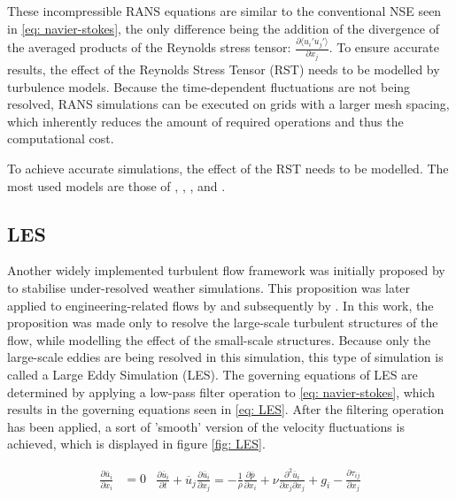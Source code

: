 These incompressible RANS equations are similar to the conventional NSE seen in \autoref{eq: navier-stokes}, the only difference being the addition of the divergence of the averaged products of the Reynolds stress tensor: $\frac{\partial \langle u_i' u_j' \rangle}{\partial x_j}$. To ensure accurate results, the effect of the Reynolds Stress Tensor (RST) needs to be modelled by turbulence models. Because the time-dependent fluctuations are not being resolved, RANS simulations can be executed on grids with a larger mesh spacing, which inherently reduces the amount of required operations and thus the computational cost. 

To achieve accurate simulations, the effect of the RST needs to be modelled. The most used models are those of \textcite{Launder1974}, \textcite{Wilcox1988}, \textcite{Spalart1992e}, \textcite{Launder1975} and \textcite{Speziale1991}. 


\subsection{LES}
Another widely implemented turbulent flow framework was initially proposed by \textcite{Smagorinsky1963} to stabilise under-resolved weather simulations. This proposition was later applied to engineering-related flows by \cite{Deardoff1970} and subsequently by \textcite{Schumann1975}. In this work, the proposition was made only to resolve the large-scale turbulent structures of the flow, while modelling the effect of the small-scale structures. Because only the large-scale eddies are being resolved in this simulation, this type of simulation is called a Large Eddy Simulation (LES). The governing equations of LES are determined by applying a low-pass filter operation to \autoref{eq: navier-stokes}, which results in the governing equations seen in \autoref{eq: LES}. After the filtering operation has been applied, a sort of 'smooth' version of the velocity fluctuations is achieved, which is displayed in figure \autoref{fig: LES}. 


\begin{subequations} \label{eq: LES}
    \begin{equation} \label{eq: LESCont}
    \begin{aligned}
    \frac{\partial  \overline{u}_i }{\partial x_i} &= 0
    \end{aligned}
    \end{equation}

    \begin{equation} \label{eq: LESMomentum}
    \begin{aligned}
   \frac{\partial \overline{u}_i}{\partial t} + \overline{u}_j \frac{\partial \overline{u}_i}{\partial x_j} = 
-\frac{1}{\rho} \frac{\partial \overline{p}}{\partial x_i} 
+ \nu \frac{\partial^2 \overline{u}_i}{\partial x_j \partial x_j} 
+ g_i 
- \frac{\partial \tau_{ij}}{\partial x_j}
    \end{aligned}
    \end{equation}
\end{subequations}

